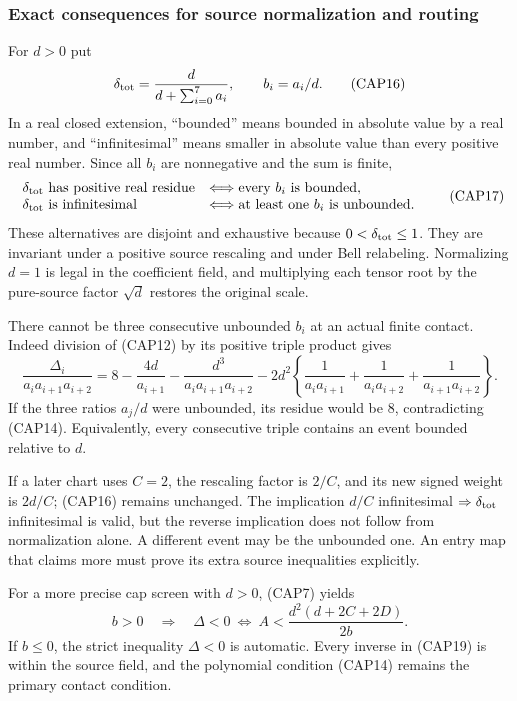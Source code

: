 \subsubsection*{Exact consequences for source normalization and routing}

For $d>0$ put
\[
\delta_{\rm tot}=\frac{d}{d+\sum_{i=0}^7a_i},
\qquad b_i=a_i/d.
\tag{CAP16}
\]
In a real closed extension, ``bounded'' means bounded in absolute
value by a real number, and ``infinitesimal'' means smaller in
absolute value than every positive real number.  Since all $b_i$
are nonnegative and the sum is finite,
\[
\begin{array}{ll}
\delta_{\rm tot}\text{ has positive real residue}
 &\Longleftrightarrow\text{every }b_i\text{ is bounded},\\
\delta_{\rm tot}\text{ is infinitesimal}
 &\Longleftrightarrow\text{at least one }b_i\text{ is unbounded}.
\end{array}
\tag{CAP17}
\]
These alternatives are disjoint and exhaustive because
$0<\delta_{\rm tot}\leq1$.  They are invariant under a positive
source rescaling and under Bell relabeling.  Normalizing $d=1$ is
legal in the coefficient field, and multiplying each tensor root by
the pure-source factor $\sqrt d$ restores the original scale.

There cannot be three consecutive unbounded $b_i$ at an actual finite
contact.  Indeed division of (CAP12) by its positive triple product
gives
\[
\frac{\Delta_i}{a_i a_{i+1}a_{i+2}}
 =8-\frac{4d}{a_{i+1}}
 -\frac{d^3}{a_i a_{i+1}a_{i+2}}
 -2d^2\left\{
 \frac1{a_i a_{i+1}}+\frac1{a_i a_{i+2}}
 +\frac1{a_{i+1}a_{i+2}}\right\}.
\tag{CAP18}
\]
If the three ratios $a_j/d$ were unbounded, its residue would be
$8$, contradicting (CAP14).  Equivalently, every consecutive triple
contains an event bounded relative to $d$.

If a later chart uses $C=2$, the rescaling factor is $2/C$, and its
new signed weight is $2d/C$; (CAP16) remains unchanged.  The implication
$d/C$ infinitesimal $\Rightarrow\delta_{\rm tot}$ infinitesimal is
valid, but the reverse implication does not follow from normalization
alone.  A different event may be the unbounded one.  An entry map that
claims more must prove its extra source inequalities explicitly.

For a more precise cap screen with $d>0$, (CAP7) yields
\[
b>0\quad\Longrightarrow\quad
\Delta<0\ \Longleftrightarrow\
A<\frac{d^2(d+2C+2D)}{2b}.
\tag{CAP19}
\]
If $b\leq0$, the strict inequality $\Delta<0$ is automatic.  Every
inverse in (CAP19) is within the source field, and the polynomial
condition (CAP14) remains the primary contact condition.



